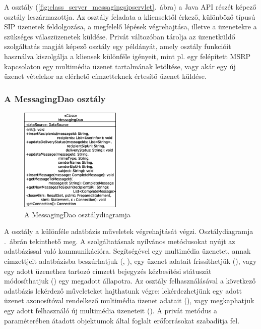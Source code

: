 A  osztály (\ref{fig:class_server_messagingsipservlet}.~ábra) a Java API részét képező  osztály leszármazottja. Az osztály feladata a kliensektől érkező, különböző típusú SIP üzenetek feldolgozása, a megfelelő lépések végrehajtása, illetve a üzenetekre a szükséges válaszüzenetek küldése. Privát változóban tárolja az üzenetküldő szolgáltatás magját képező  osztály egy példányát, amely osztály funkcióit használva kiszolgálja a kliensek különféle igényeit, mint pl. egy felépített MSRP kapcsolaton egy multimédia üzenet tartalmának letöltése, vagy akár egy új üzenet vételekor az elérhető címzetteknek értesítő üzenet küldése.

\subsubsection*{A MessagingDao osztály}
\label{sec:server_messagingdao}

\begin{figure}
  \vspace{-40pt}
  \begin{center}
    \includegraphics[width=0.43\textwidth]{img/class_diagrams/server/eps/MessagingDao.eps}
  \end{center}
  \vspace{-15pt}
  \captionsetup{font=scriptsize}
  \caption{A MessagingDao osztálydiagramja}
   \label{fig:class_server_messagingdao}
  \vspace{-10pt}
\end{figure}

A  osztály a különféle adatbázis műveletek végrehajtását végzi. Osztálydiagramja .~ábrán tekinthető meg. A szolgáltatásnak nyílvános metódusokat nyújt az adatbázissal való kommunikációra. Segítségével egy multimédia üzenetet, annak címzettjeit adatbázisba beszúrhatjuk (, ), egy üzenet adatait frissíthetjük (), vagy egy adott üzenethez tartozó címzett bejegyzés kézbesítési státuszát módosíthatjuk () egy megadott állapotra. Az osztály felhasználásával a következő adatbázis lekérdező műveleteket hajthatunk végre: lekérdezhetjünk egy adott üzenet azonosítóval rendelkező multimédia üzenet adatait (), vagy megkaphatjuk egy adott felhasználó új multimédia üzeneteit (). A  privát metódus a paraméterében átadott objektumok által foglalt erőforrásokat szabadítja fel.

